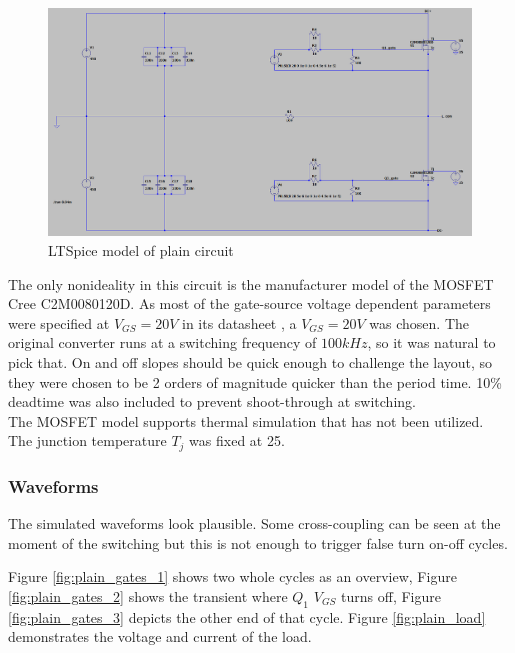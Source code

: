 \begin{figure}[H]
	\centering
	\includegraphics[width=\textwidth]{pictures/implementation/plain/spice_plain_1.PNG}
	\caption{LTSpice model of plain circuit}
	\label{fig:spice_plain_1}
\end{figure}

The only nonideality in this circuit is the manufacturer model \cite{mosfet_2} of the MOSFET Cree C2M0080120D. As most of the gate-source voltage dependent parameters were specified at $V_{GS} = 20V$ in its datasheet \cite{mosfet}, a $V_{GS} = 20V$ was chosen. The original converter runs at a switching frequency of $100 kHz$, so it was natural to pick that. On and off slopes should be quick enough to challenge the layout, so they were chosen to be 2 orders of magnitude quicker than the period time. 10\% deadtime was also included to prevent shoot-through at switching.\\

The MOSFET model supports thermal simulation that has not been utilized. The junction temperature $T_j$ was fixed at 25\textcelsius.

\subsubsection{Waveforms}
\label{sec:plain_waveforms}

The simulated waveforms look plausible. Some cross-coupling can be seen at the moment of the switching but this is not enough to trigger false turn on-off cycles.

Figure \ref{fig:plain_gates_1} shows two whole cycles as an overview, Figure \ref{fig:plain_gates_2} shows the transient where $ Q_1$ $V_{GS}$ turns off, Figure \ref{fig:plain_gates_3} depicts the other end of that cycle. Figure \ref{fig:plain_load} demonstrates the voltage and current of the load.

